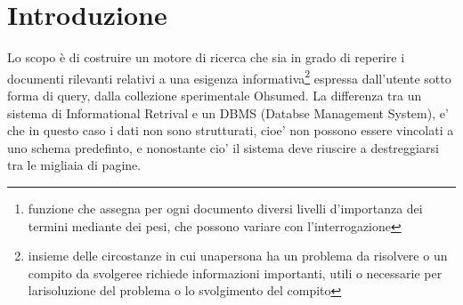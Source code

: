 \documentclass[runningheads]{llncs}
\begin{document}
\begin{abstract}
Esistono diversi modi per risolvere questo problema, nel nostro caso abbiamo ricercato la configurazione migliore tra un sistema di
reperimento con o senza uso di stopwords e il tuning dei parametri dello schema di pesatura\footnote{funzione che assegna per ogni documento diversi livelli d’importanza dei termini mediante dei pesi, che possono variare con l’interrogazione} BM25F.
Abbiamo calibrato le nostre scelte e tratto le conlcusioni finali facendo delle prove di reperimento di documenti con diverse combinazioni tra schemi di pesatura e liste di stop word, andando a confrontare due parametri fondamentali: il map, cioe' il 'mean average precision', un indicatore della precisione media del documento in corrispondenza di una determinata interrogazione, e il numero di documenti rilevanti reperiti.
Nei prossimi paragrafi si descriveranno nello specifico i metodi utlizzati per quanto riguarda l'indicizzazione e il reperimento di documenti, accompagnati dai risultati che abbiamo ottenuto negli esperimenti, principalmente sotto forma di tabelle.
Questo progetto tratta la realizzazione attraverso il pacchetto \emph{Whoosh}, di un motore di ricerca
volto al reperimento di documenti della collezione sperimentale \emph{OHSUMED} indicizzata opportunamente.
Il progetto è anche corredato di un webserver che permette all'utente di interrogare il motore di ricerca
in forma interattiva attraverso un browser a scelta.
\end{abstract}

\section{Introduzione}
\label{sec:introduzione}

Lo scopo è di costruire un motore di ricerca che sia in grado di reperire i documenti rilevanti relativi a una esigenza informativa\footnote{insieme delle circostanze in cui unapersona ha un problema da risolvere o un compito da svolgeree richiede informazioni importanti, utili o necessarie per larisoluzione del problema o lo svolgimento del compito}
espressa dall'utente sotto forma di query, dalla collezione sperimentale Ohsumed.
La differenza tra un sistema di Informational Retrival e un DBMS (Databse Management System), e' che in questo caso i dati non sono strutturati, cioe' non possono essere vincolati a uno schema predefinto, e nonostante cio' il sistema deve riuscire a destreggiarsi tra le migliaia di pagine.
\end{document}
